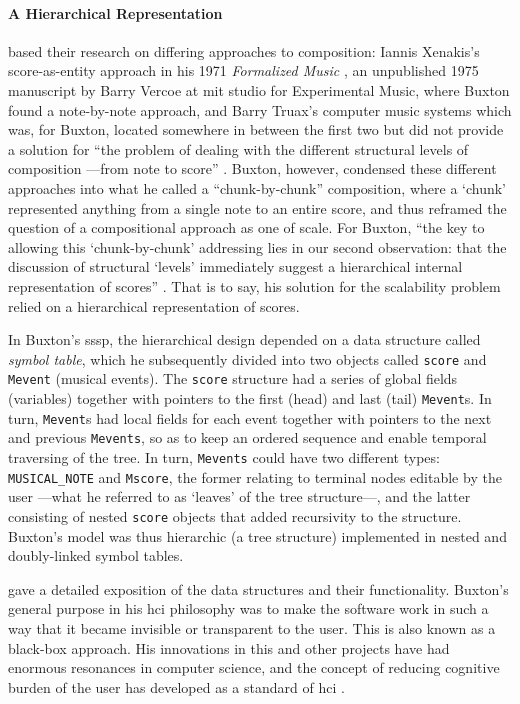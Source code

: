 	\paragraph{A Hierarchical Representation}
	\textcite{DBLP:conf/icmc/BuxtonFBRSCM78} based their research on differing approaches to composition: Iannis Xenakis's score-as-entity approach in his 1971 \textit{Formalized Music} \parencite{Xen92:For}, an unpublished 1975 manuscript by Barry Vercoe at \gls{mit} studio for Experimental Music, where Buxton found a note-by-note approach, and Barry Truax's computer music systems \parencite{Tru73:The} which was, for Buxton, located somewhere in between the first two but did not provide a solution for ``the problem of dealing with the different structural levels of composition ---from note to score'' \parencite[120]{icmc/bbp2372.1978.012} . Buxton, however, condensed these different approaches into what he called a ``chunk-by-chunk'' composition, where a `chunk' represented anything from a single note to an entire score, and thus reframed the question of a compositional approach as one of scale. For Buxton, ``the key to allowing this `chunk-by-chunk' addressing lies in our second observation: that the discussion of structural `levels' immediately suggest a hierarchical internal representation of scores'' \parencite[120]{icmc/bbp2372.1978.012}. That is to say, his solution for the scalability problem relied on a hierarchical representation of scores. 

	In Buxton's \gls{sssp}, the hierarchical design depended on a data structure called \textit{symbol table}, which he subsequently divided into two objects called \texttt{score} and \texttt{Mevent} (musical events). The \texttt{score} structure had a series of global fields (variables) together with pointers to the first (head) and last (tail) \texttt{Mevent}s. In turn, \texttt{Mevent}s had local fields for each event together with pointers to the next and previous \texttt{Mevents}, so as to keep an ordered sequence  and enable temporal traversing of the tree. In turn, \texttt{Mevents} could have two different types: \texttt{MUSICAL\_NOTE} and \texttt{Mscore}, the former relating to terminal nodes editable by the user ---what he referred to as `leaves' of the tree structure---, and the latter consisting of nested \texttt{score} objects that added recursivity to the structure. Buxton's model was thus hierarchic (a tree structure) implemented in nested and doubly-linked symbol tables.

	\textcite{icmc/bbp2372.1978.012} gave a detailed exposition of the data structures and their functionality. Buxton's general purpose in his \gls{hci} philosophy was to make the software work in such a way that it became invisible or transparent to the user. This is also known as a black-box approach. His innovations in this and other projects have had enormous resonances in computer science, and the concept of reducing cognitive burden of the user has developed as a standard of \gls{hci} \parencite{youtube/buxton16}.

